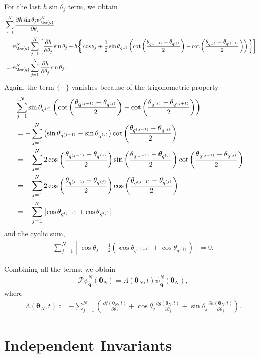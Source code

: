 \documentclass[
amsmath,amssymb,
]{revtex4-2}
\begin{document}
For the last $h \sin \theta_j$ term, we obtain
\begin{align}
    &\sum_{j=1}^N \frac{\partial  h\sin \theta_j \psi^N_{\bm{q}} }{\partial \theta_j}\cr
    &= \psi^N_{\bm{q}}\sum_{j=1}^N\bigg[\frac{\partial h}{\partial \theta_j}\sin \theta_j
    + h\bigg\{\cos \theta_j + \frac{1}{2}\sin \theta_{q^{(j)}} \left(\cot\left(\frac{\theta_{q^{(j-1)}}-\theta_{q^{(j)}}}{2}\right) - \cot\left(\frac{\theta_{q^
    {(j)}}-\theta_{q^{(j+1)}}}{2}\right)\right)\bigg\}\bigg]\cr
    &= \psi^N_{\bm{q}}\sum_{j=1}^N \frac{\partial h}{\partial \theta_j}\sin \theta_j.
\end{align}
Again, the term $\{\cdots\}$ vanishes because of the trigonometric property
\begin{align}
&\sum_{j=1}^N \sin \theta_{q^{(j)}} \left(\cot\left(\frac{\theta_{q^{(j-1)}}-\theta_{q^{(j)}}}{2}\right) - \cot\left(\frac{\theta_{q^{(j)}}-\theta_{q^{(j+1)}}}{2}\right)\right) \cr
&= -\sum_{j=1}^N \left(\sin\theta_{q^{(j-1)}} -\sin\theta_{q^{(j)}}\right) \cot\left(\frac{\theta_{q^{(j-1)}}-\theta_{q^{(j)}}}{2}\right) \cr
&=-\sum_{j=1}^N 2\cos\bigg(\frac{\theta_{q^{(j-1)}}+\theta_{q^{(j)}}}{2}\bigg)\sin\bigg(\frac{\theta_{q^{(j-1)}}-\theta_{q^{(j)}}}{2}\bigg)\cot\left(\frac{\theta_{q^{(j-1)}}-\theta_{q^{(j)}}}{2}\right) \cr
&=-\sum_{j=1}^N 2\cos\bigg(\frac{\theta_{q^{(j-1)}}+\theta_{q^{(j)}}}{2}\bigg)\cos\bigg(\frac{\theta_{q^{(j-1)}}-\theta_{q^{(j)}}}{2}\bigg) \cr
&=-\sum_{j=1}^N \left[ \cos \theta_{q^{(j-1)}} + \cos \theta_{q^{(j)}}\right]
\end{align}
and the cyclic sum,
%
\begin{align}
    \sum_{j=1}^N \left[\cos\theta_j - \frac{1}{2} \left(\cos \theta_{q^{(j-1)}} + \cos \theta_{q^{(j)}}\right)\right] = 0.
\end{align}

Combining all the terms, we obtain
\begin{align}
    \mathcal{P} \psi_{\bm{q}}^N(\bm{\theta}_N) = \Lambda(\bm{\theta}_N, t) \psi_{\bm{q}}^N(\bm{\theta}_N),
\end{align}
where
\begin{align}
    \Lambda(\bm{\theta}_N, t)
    := -\sum_{j=1}^N \left(
    \frac{\partial f(\bm{\theta}_N, t)}{\partial \theta_j}
    + \cos \theta_j \frac{\partial g(\bm{\theta}_N, t)}{\partial \theta_j}
    + \sin \theta_j \frac{\partial h(\bm{\theta}_N, t)}{\partial \theta_j}
    \right).
\end{align}

\section{Independent Invariants}
\label{sec:independent_invariants}
\end{document}
